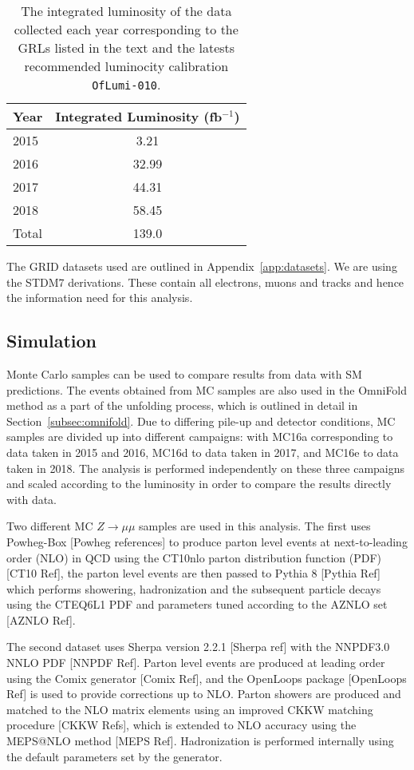 \begin{table}[h!]
    \centering
    \begin{tabular}{l|c}
    \hline
    \textbf{Year} & \textbf{Integrated Luminosity (fb$^{-1}$)} \\ \hline
    2015  &   3.21 \\\hline
    2016  &  32.99 \\\hline
    2017  &  44.31 \\ \hline
    2018  &  58.45 \\ \hline\hline
    Total & 139.0 \\ \hline
    \end{tabular}
    \caption{The integrated luminosity of the data collected each year corresponding to the GRLs listed in the text and the latests recommended luminocity calibration \texttt{OfLumi-010}.}
    \label{tab:LumiYear}
\end{table}

The GRID datasets used are outlined in Appendix~\ref{app:datasets}. We are using the STDM7 derivations.
These contain all electrons, muons and tracks and hence the information need for this analysis.

\subsection{Simulation}
Monte Carlo samples can be used to compare results from data with SM predictions. The events obtained from MC samples are also used in the OmniFold method as a part of the unfolding process, which is outlined in detail in Section~\ref{subsec:omnifold}.
Due to differing pile-up and detector conditions, MC samples are divided up into different campaigns: with MC16a corresponding to data taken in 2015 and 2016, MC16d to data taken in 2017, and MC16e to data taken in 2018. The analysis is performed independently
on these three campaigns and scaled according to the luminosity in order to compare the results directly with data.

Two different MC $Z\rightarrow\mu\mu$ samples are used in this analysis. The first uses Powheg-Box [Powheg references] to produce parton level events at next-to-leading order (NLO) in QCD using the CT10nlo parton distribution function (PDF) [CT10 Ref], the parton level events are
then passed to Pythia 8 [Pythia Ref] which performs showering, hadronization and the subsequent particle decays using the CTEQ6L1 PDF and parameters tuned according to the AZNLO set [AZNLO Ref].

The second dataset uses Sherpa version 2.2.1 [Sherpa ref] with the NNPDF3.0 NNLO PDF [NNPDF Ref]. Parton level events are produced at leading order using the Comix generator [Comix Ref], and the OpenLoops package [OpenLoops Ref] is used to provide corrections up to NLO.
Parton showers are produced and matched to the NLO matrix elements using an improved CKKW matching procedure [CKKW Refs], which is extended to NLO accuracy using the MEPS@NLO method [MEPS Ref]. Hadronization is performed internally using the default parameters set by the generator.


